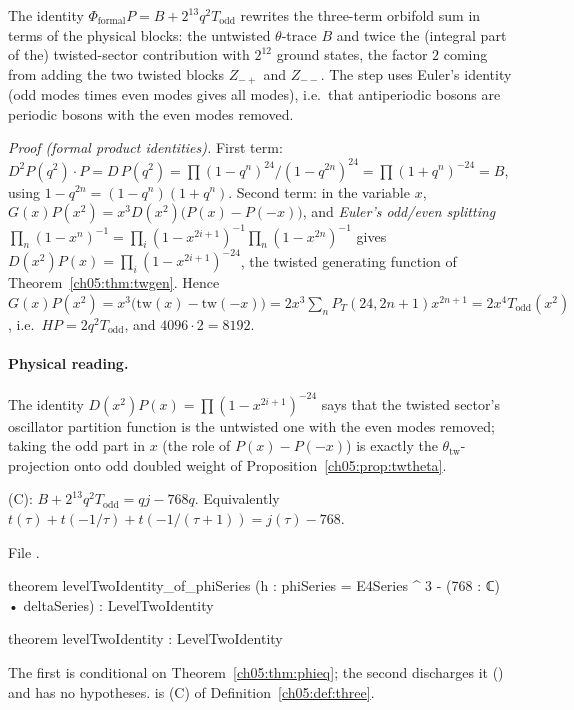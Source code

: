 \begin{physics}
The identity $\Phi_{\mathrm{formal}}P=B+2^{13}q^2T_{\mathrm{odd}}$ rewrites the three-term orbifold sum in terms of the physical blocks: the untwisted $\theta$-trace $B$ and twice the (integral part of the) twisted-sector contribution with $2^{12}$ ground states, the factor $2$ coming from adding the two twisted blocks $Z_{-+}$ and $Z_{--}$. The step uses Euler's identity (odd modes times even modes gives all modes), i.e.\ that antiperiodic bosons are periodic bosons with the even modes removed.
\end{physics}
\noindent\emph{Proof (formal product identities).} First term: $D^2P(q^2)\cdot P = D\,P(q^2) =
\prod(1-q^n)^{24}/(1-q^{2n})^{24} = \prod(1+q^n)^{-24} = B$, using $1-q^{2n} = (1-q^n)(1+q^n)$.
Second term: in the variable $x$, $G(x)P(x^2) = x^3D(x^2)\bigl(P(x)-P(-x)\bigr)$, and
\emph{Euler's odd/even splitting} $\prod_n(1-x^n)^{-1} = \prod_i(1-x^{2i+1})^{-1}\prod_n(1-x^{2n})^{-1}$
gives $D(x^2)P(x) = \prod_i(1-x^{2i+1})^{-24}$, the twisted generating function of
Theorem~\ref{ch05:thm:twgen}. Hence $G(x)P(x^2) = x^3\bigl(\mathrm{tw}(x) - \mathrm{tw}(-x)\bigr) =
2x^3\sum_nP_T(24,2n+1)x^{2n+1} = 2x^4T_{\mathrm{odd}}(x^2)$, i.e.\ $HP = 2q^2T_{\mathrm{odd}}$, and
$4096\cdot2 = 8192$.

\paragraph{Physical reading.} The identity $D(x^2)P(x) = \prod(1-x^{2i+1})^{-24}$ says that the twisted
sector's oscillator partition function is the untwisted one with the even modes removed; taking the odd part in $x$
(the role of $P(x)-P(-x)$) is exactly the $\theta_{\mathrm{tw}}$-projection onto odd doubled weight of
Proposition~\ref{ch05:prop:twtheta}.

\begin{theorem}\label{ch05:thm:leveltwo}
(C): $B + 2^{13}q^2T_{\mathrm{odd}} = qj - 768q$. Equivalently $t(\tau)+t(-1/\tau)+t(-1/(\tau+1)) = j(\tau) - 768$.
\end{theorem}
\noindent File .
\begin{leancode}
theorem levelTwoIdentity_of_phiSeries (h : phiSeries = E4Series ^ 3 - (768 : ℂ) • deltaSeries) :
    LevelTwoIdentity

theorem levelTwoIdentity : LevelTwoIdentity
\end{leancode}
\begin{dictionary}
The first is conditional on Theorem~\ref{ch05:thm:phieq}; the second discharges it
() and has no hypotheses.
 is (C) of Definition~\ref{ch05:def:three}.
\end{dictionary}

